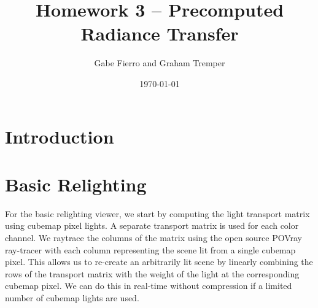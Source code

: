 \documentclass[11pt]{article}
\begin{document}
\title{Homework 3 -- Precomputed Radiance Transfer}
\author{Gabe Fierro and Graham Tremper}
\date{\today}
\maketitle

\section{Introduction}

\section{Basic Relighting}

For the basic relighting viewer, we start by computing the light transport
matrix using cubemap pixel lights. A separate transport matrix is used for each
color channel. We raytrace the columns of the matrix using the open source
POVray ray-tracer with each column representing the scene lit from a single
cubemap pixel. This allows us to re-create an arbitrarily lit scene by linearly
combining the rows of the transport matrix with the weight of the light at the
corresponding cubemap pixel. We can do this in real-time without compression if
a limited number of cubemap lights are used.
\end{document}
